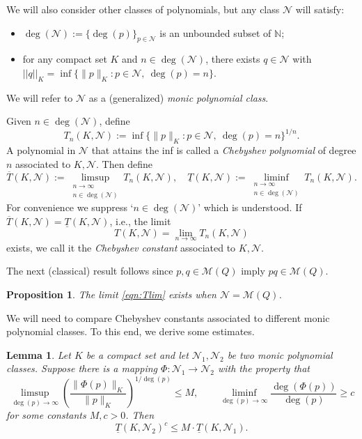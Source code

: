 \documentclass[12pt]{article}
\numberwithin{equation}{section}
\newtheorem{proposition}[theorem]{Proposition}
\newtheorem{lemma}[theorem]{Lemma}
\newcommand{\N}{\mathbb{N}}
\newcommand{\calM}{\mathcal{M}}
\newcommand{\calN}{\mathcal{N}}
\begin{document}
We will also consider other classes of polynomials,  but any class $\calN$ will satisfy:%
\begin{itemize}
\item[(i)] $\deg(\calN):=\{\deg(p)\}_{p\in\calN}$ is an unbounded subset of $ \N$;
\item[(ii)] for any compact set $K$ and $n\in\deg(\calN)$, there exists $q\in \calN$ with 
$||q||_K = \inf\{\|p\|_K\colon p\in\calN,\ \deg(p)=n\}$.
\end{itemize}
We will refer to $\calN$ as a (generalized) \emph{monic polynomial class}.  

Given $n\in\deg(\calN)$, define
\begin{equation}\label{eqn:Tndef}
T_n(K,\calN):= \inf\{\|p\|_K\colon p\in\calN,\ \deg(p)=n\}^{1/n}.
\end{equation}
A polynomial in $\calN$ that attains the inf is called a \emph{Chebyshev polynomial} of degree $n$ associated to $K, \calN$.  Then  
define 
\begin{equation}\label{eqn:Tdef}
\overline T(K, \calN):=\limsup_{\substack{n\to\infty\\ n\in\deg(\calN)}} T_n(K, \calN),\quad \underline T(K, \calN):=\liminf_{\substack{n\to\infty\\ n\in\deg(\calN)}} T_n(K, \calN).
\end{equation}
For convenience we suppress `$n\in\deg(\calN)$' which is understood.  
If $\overline T(K, \calN) = \underline T(K, \calN)$, i.e., the limit
\begin{equation}\label{eqn:Tlim}
T(K, \calN)= \lim_{n\to\infty}T_n(K, \calN) \end{equation} 
exists, we call it the \emph{Chebyshev constant} associated to $K, \calN$.  %

The next (classical) result follows since $p,q \in \calM(Q)$ imply $pq\in \calM(Q)$.

\begin{proposition}\label{prop:classical}
The limit \eqref{eqn:Tlim} exists when $\calN=\calM(Q)$.
\end{proposition}

We will need to compare Chebyshev constants associated to different monic polynomial classes. To this end, we derive some estimates.   
\begin{lemma}\label{lem:Tinf}
Let $K$ be a compact set and let $\calN_1,\calN_2$ be two monic polynomial classes. 
 Suppose there is a mapping $\Phi\colon\calN_1\to\calN_2$ with the property that %
$$ \limsup_{\deg(p)\to\infty} \left(\frac{ \|\Phi(p)\|_K}{\|p\|_K}\right)^{1/\deg(p)} \leq M,\qquad        
    \liminf_{\deg(p)\to\infty}\frac{\deg(\Phi(p))}{\deg(p)} \geq c    $$
for some constants $M, c>0$.  
 Then
\begin{equation}\label{eqn:Tinf}
\underline T(K,\calN_2)^c \leq M\cdot \underline T(K,\calN_1). 
\end{equation}
\end{lemma}
\end{document}
